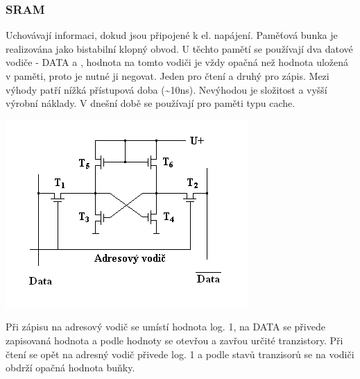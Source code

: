 \subsubsection{SRAM}
\begin{multicols}{2}
    Uchovávají informaci, dokud jsou připojené k el. napájení.
    Paměťová bunka je realizována jako bistabilní klopný obvod.
    U těchto pamětí se používají dva datové vodiče - DATA a , hodnota na tomto vodiči je vždy opačná než hodnota uložená v paměti, proto je nutné ji negovat.
    Jeden pro čtení a druhý pro zápis.
    Mezi výhody patří nížká přístupová doba (\textasciitilde10ns).
    Nevýhodou je složitost a vyšší výrobní náklady.
    V dnešní době se používají pro paměti typu cache.
    \columnbreak

    \includegraphics[width=0.8\linewidth]{TVY-POS/Polovodicove-pameti/SRAMM.png}
\end{multicols}
Při zápisu na adresový vodič se umístí hodnota log. 1, na DATA se přivede zapisovaná hodnota a podle hodnoty se otevřou a zavřou určité tranzistory.
Při čtení se opět na adresný vodič přivede log. 1 a podle stavů tranzisorů se na vodiči  obdrží opačná hodnota buňky.
